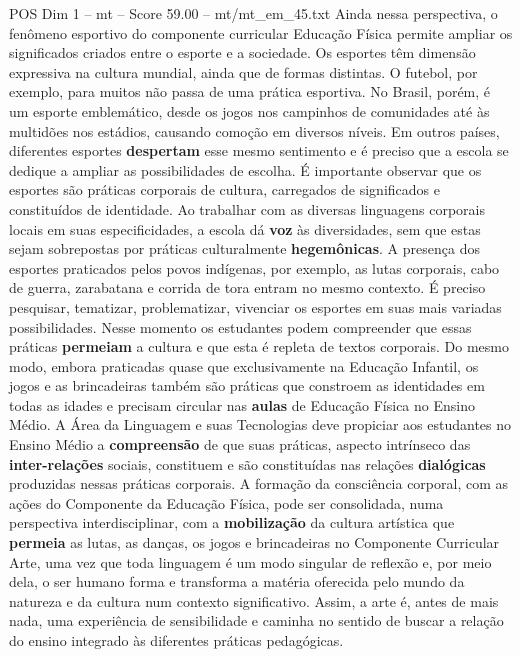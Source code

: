 \begin{textsample}{POS Dim 1 – mt – Score 59.00 – mt/mt\_em\_45.txt}  \label{ex:f1_pos_079}
Ainda nessa perspectiva, o fenômeno esportivo do componente curricular Educação Física permite ampliar os significados criados entre o esporte e a sociedade.
Os esportes têm dimensão expressiva na cultura mundial, ainda que de formas distintas.
O futebol, por exemplo, para muitos não passa de uma prática esportiva.
No Brasil, porém, é um esporte emblemático, desde os jogos nos campinhos de comunidades até às multidões nos estádios, causando comoção em diversos níveis.
Em outros países, diferentes esportes \textbf{despertam} esse mesmo sentimento e é preciso que a escola se dedique a ampliar as possibilidades de escolha.
É importante observar que os esportes são práticas corporais de cultura, carregados de significados e constituídos de identidade.
Ao trabalhar com as diversas linguagens corporais locais em suas especificidades, a escola dá \textbf{voz} às diversidades, sem que estas sejam sobrepostas por práticas culturalmente \textbf{hegemônicas}.
A presença dos esportes praticados pelos povos indígenas, por exemplo, as lutas corporais, cabo de guerra, zarabatana e corrida de tora entram no mesmo contexto.
É preciso pesquisar, tematizar, problematizar, vivenciar os esportes em suas mais variadas possibilidades.
Nesse momento os estudantes podem compreender que essas práticas \textbf{permeiam} a cultura e que esta é repleta de textos corporais.
Do mesmo modo, embora praticadas quase que exclusivamente na Educação Infantil, os jogos e as brincadeiras também são práticas que constroem as identidades em todas as idades e precisam circular nas \textbf{aulas} de Educação Física no Ensino Médio.
A Área da Linguagem e suas Tecnologias deve propiciar aos estudantes no Ensino Médio a \textbf{compreensão} de que suas práticas, aspecto intrínseco das \textbf{inter-relações} sociais, constituem e são constituídas nas relações \textbf{dialógicas} produzidas nessas práticas corporais.
A formação da consciência corporal, com as ações do Componente da Educação Física, pode ser consolidada, numa perspectiva interdisciplinar, com a \textbf{mobilização} da cultura artística que \textbf{permeia} as lutas, as danças, os jogos e brincadeiras no Componente Curricular Arte, uma vez que toda linguagem é um modo singular de reflexão e, por meio dela, o ser humano forma e transforma a matéria oferecida pelo mundo da natureza e da cultura num contexto significativo.
Assim, a arte é, antes de mais nada, uma experiência de sensibilidade e caminha no sentido de buscar a relação do ensino integrado às diferentes práticas pedagógicas.

\end{textsample}
